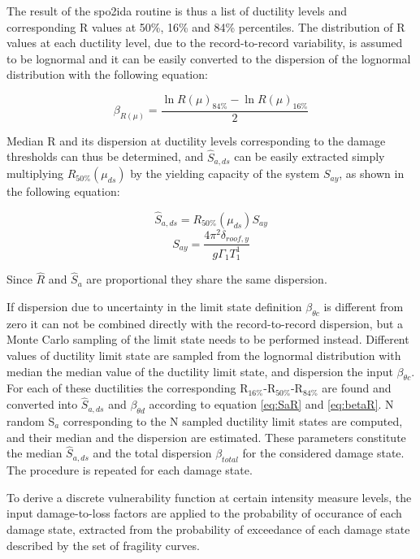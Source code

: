 The result of the spo2ida routine is thus a list of ductility levels and corresponding R values at 50\%, 16\% and 84\% percentiles. The distribution of R values at each ductility level, due to the record-to-record variability, is assumed to be lognormal and it can be easily converted to the dispersion of the lognormal distribution with the following equation:

\begin{equation}
\beta_{R(\mu)} = \frac{\ln R(\mu)_{84\%} - \ln R(\mu)_{16\%}}{2}
\label{eq:betaR}
\end{equation} 

Median R and its dispersion at ductility levels corresponding to the damage thresholds can thus be determined, and $\hat{S}_{a,ds}$ can be easily extracted simply multiplying $R_{50\%}(\mu_{ds})$ by the yielding capacity of the system $S_{ay}$, as shown in the following equation:

\begin{equation}
\hat{S}_{a,ds} = R_{50\%}(\mu_{ds}) S_{ay}
\label{eq:SaR}
\end{equation}
\begin{equation}
S_{ay} = \frac{4 \pi^2 \delta_{roof,y}}{g \Gamma_1 T_1^1}
\end{equation}

Since $\hat{R}$ and $\hat{S}_{a}$ are proportional they share the same dispersion.

If dispersion due to uncertainty in the limit state definition $\beta_{\theta c}$ is different from zero it can not be combined directly with the record-to-record dispersion, but a Monte Carlo sampling of the limit state needs to be performed instead. Different values of ductility limit state are sampled from the  lognormal distribution with median the median value of the ductility limit state, and dispersion the input $\beta_{\theta c}$. For each of these ductilities the corresponding R$_{16\%}$-R$_{50\%}$-R$_{84\%}$ are found and converted into $\hat{S}_{a,ds}$ and $\beta_{\theta d}$ according to equation \ref{eq:SaR} and \ref{eq:betaR}. N random S$_a$ corresponding to the N sampled ductility limit states are computed, and their median and the dispersion are estimated. These parameters constitute the median $\hat{S}_{a,ds}$ and the total dispersion $\beta_{total}$ for the considered damage state. The procedure is repeated for each damage state.

To derive a discrete vulnerability function at certain intensity measure levels, the input damage-to-loss factors are applied to the probability of occurance of each damage state, extracted from the probability of exceedance of each damage state described by the set of fragility curves. 

